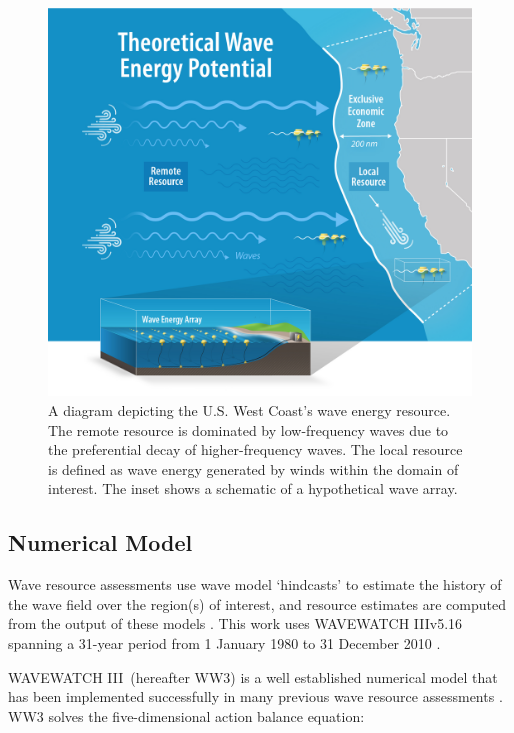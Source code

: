 \begin{figure}[ht]
\centering
\includegraphics[width=\linewidth]{../../fig/NREL-WaveGraphic_v06.png}
\caption{A diagram depicting the U.S. West Coast's wave energy resource. The remote resource is dominated by low-frequency waves due to the preferential decay of higher-frequency waves. The local resource is defined as wave energy generated by winds within the domain of interest. The inset shows a schematic of a hypothetical wave array.}
\label{fig:diagram:west-eez}
\end{figure}

\subsection{Numerical Model} \label{sec:method:model}

Wave resource assessments use wave model `hindcasts' to estimate the history of the wave field over the region(s) of interest, and resource estimates are computed from the output of these models \citep{internationalelectrotechnicalcommissionPart101Wave2015}. This work uses WAVEWATCH III\textregistered v5.16 spanning a 31-year period from 1 January 1980 to 31 December 2010 \citep{tolmanDistributedmemoryConceptsWave2002,tolmanwavewatch}.

WAVEWATCH III\textregistered \ (hereafter WW3) is a well established numerical model that has been implemented successfully in many previous wave resource assessments \citep[e.g.,][]{garcia-medinaWaveResourceAssessment2014,hemerRevisedAssessmentAustralia2017,yangWaveModelTest2017}.
WW3 solves the five-dimensional action balance equation:


